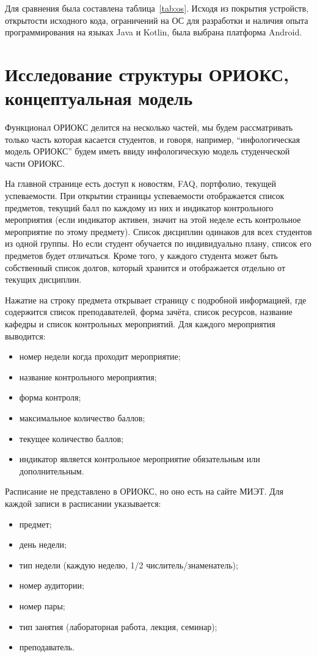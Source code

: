 Для сравнения была составлена таблица~\ref{tab:os}.
Исходя из покрытия устройств, открытости исходного кода, ограничений на ОС для разработки и наличия опыта программирования на языках Java и Kotlin, была выбрана платформа Android.


\section{Исследование структуры ОРИОКС, концептуальная модель}
\label{sec:orioksStructure}

Функционал ОРИОКС делится на несколько частей, мы будем рассматривать только часть которая касается студентов, и говоря, например, ``инфологическая модель ОРИОКС'' будем иметь ввиду инфологическую модель студенческой части ОРИОКС\@.

На главной странице есть доступ к новостям, FAQ, портфолио, текущей успеваемости.
При открытии страницы успеваемости отображается список предметов, текущий балл по каждому из них и индикатор контрольного мероприятия (если индикатор активен, значит на этой неделе есть контрольное мероприятие по этому предмету).
Список дисциплин одинаков для всех студентов из одной группы.
Но если студент обучается по индивидуально плану, список его предметов будет отличаться.
Кроме того, у каждого студента может быть собственный список долгов, который хранится и отображается отдельно от текущих дисциплин.

Нажатие на строку предмета открывает страницу с подробной информацией, где содержится список преподавателей, форма зачёта, список ресурсов, название кафедры и список контрольных мероприятий.
Для каждого мероприятия выводится:
\begin{itemize}
  \item номер недели когда проходит мероприятие;
  \item название контрольного мероприятия;
  \item форма контроля;
  \item максимальное количество баллов;
  \item текущее количество баллов;
  \item индикатор является контрольное мероприятие обязательным или дополнительным.
\end{itemize}

Расписание не представлено в ОРИОКС, но оно есть на сайте МИЭТ.
Для каждой записи в расписании указывается:
\begin{itemize}
  \item предмет;
  \item день недели;
  \item тип недели (каждую неделю, 1/2 числитель/знаменатель);
  \item номер аудитории;
  \item номер пары;
  \item тип занятия (лабораторная работа, лекция, семинар);
  \item преподаватель.
\end{itemize}


